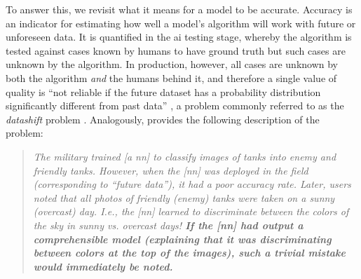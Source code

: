 To answer this, we revisit what it means for a model to be accurate. Accuracy is an indicator for estimating how well a model's algorithm will work with future or unforeseen data. It is quantified in the \gls{ai} testing stage, whereby the algorithm is tested against cases known by humans to have ground truth but such cases are unknown by the algorithm. In production, however, all cases are unknown by both the algorithm \textit{and} the humans behind it, and therefore a single value of quality is ``not reliable if the future dataset has a probability distribution significantly different from past data'' \citep{Freitas:2014ic}, a problem commonly referred to as the \textit{datashift} problem \citep{Sugiyama:2017ud}. Analogously, \citet{Freitas:2014ic} provides the following description of the problem:

\begin{quote}
\itshape
The military trained [a \gls{nn}] to classify images of tanks into enemy and friendly tanks. However, when the [\gls{nn}] was deployed in the field (corresponding to ``future data''), it had a poor accuracy rate. Later, users noted that all photos of friendly (enemy) tanks were taken on a sunny (overcast) day. I.e., the [\gls{nn}] learned to discriminate between the colors of the sky in sunny vs. overcast days! \textbf{If the [\gls{nn}] had output a comprehensible model (explaining that it was discriminating between colors at the top of the images), such a trivial mistake would immediately be noted.}
\upshape
\citep{Freitas:2014ic}
\end{quote}

